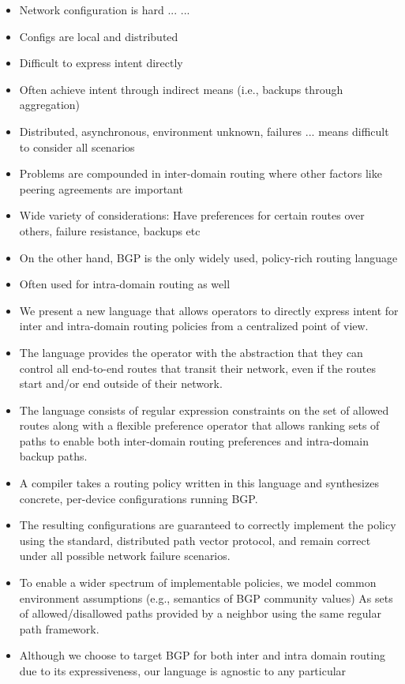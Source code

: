 \documentclass{sigplanconf}
\begin{document}
\begin{itemize}
	\item Network configuration is hard ... ...
	\item Configs are local and distributed
	\item Difficult to express intent directly
	\item Often achieve intent through indirect means (i.e., backups through aggregation)
	\item Distributed, asynchronous, environment unknown, failures ... means difficult to consider all scenarios	
	\item Problems are compounded in inter-domain routing where other factors like peering agreements are important
	\item Wide variety of considerations: Have preferences for certain routes over others, failure resistance, backups etc
	\item On the other hand, BGP is the only widely used, policy-rich routing language
	\item Often used for intra-domain routing as well
	\item We present a new language that allows operators to directly express intent for inter and intra-domain routing policies 
		  from a centralized point of view.
	\item The language provides the operator with the abstraction that they can control all end-to-end routes that transit their 
		  network, even if the routes start and/or end outside of their network.
	\item The language consists of regular expression constraints on the set of allowed routes along with a flexible preference operator
		  that allows ranking sets of paths to enable both inter-domain routing preferences and intra-domain backup paths.
	\item A compiler takes a routing policy written in this language and synthesizes concrete, per-device configurations running BGP. 
	\item The resulting configurations are guaranteed to correctly implement the policy using the standard, distributed path vector protocol, 
		  and remain correct under all possible network failure scenarios.
	\item To enable a wider spectrum of implementable policies, we model common environment assumptions (e.g., semantics of BGP community values)
		  As sets of allowed/disallowed paths provided by a neighbor using the same regular path framework.
	\item Although we choose to target BGP for both inter and intra domain routing due to its expressiveness, our language is agnostic to any particular 

\end{itemize}
\end{document}
